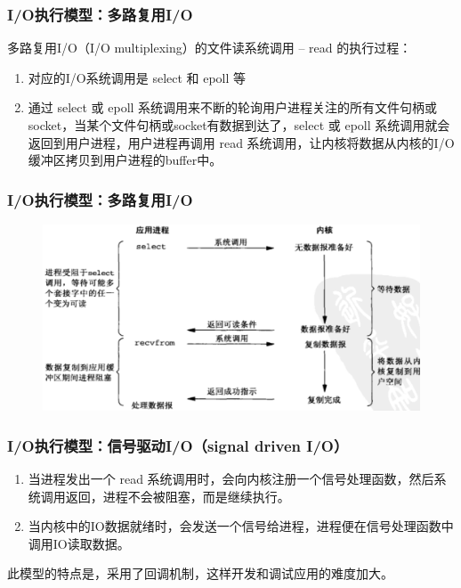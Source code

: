 \begin{frame}[fragile]
    \frametitle{I/O执行模型：多路复用I/O}
    多路复用I/O（I/O multiplexing）的文件读系统调用 – read 的执行过程：
    \begin{enumerate}
        \item 对应的I/O系统调用是 select 和 epoll 等    
        \item 通过 select 或 epoll 系统调用来不断的轮询用户进程关注的所有文件句柄或socket，当某个文件句柄或socket有数据到达了，select 或 epoll 系统调用就会返回到用户进程，用户进程再调用 read 系统调用，让内核将数据从内核的I/O缓冲区拷贝到用户进程的buffer中。
    \end{enumerate}       
    

    
\end{frame}
\begin{frame}[fragile]
    \frametitle{I/O执行模型：多路复用I/O}
    \begin{figure}
        \includegraphics[width=0.8\linewidth]{figs/multi-io.png}
    \end{figure}
\end{frame}
\begin{frame}[fragile]
    \frametitle{I/O执行模型：信号驱动I/O（signal driven I/O）}
    \begin{enumerate}
\item 当进程发出一个 read 系统调用时，会向内核注册一个信号处理函数，然后系统调用返回，进程不会被阻塞，而是继续执行。
\item 当内核中的IO数据就绪时，会发送一个信号给进程，进程便在信号处理函数中调用IO读取数据。
    \end{enumerate}
    此模型的特点是，采用了回调机制，这样开发和调试应用的难度加大。 
    
\end{frame}
